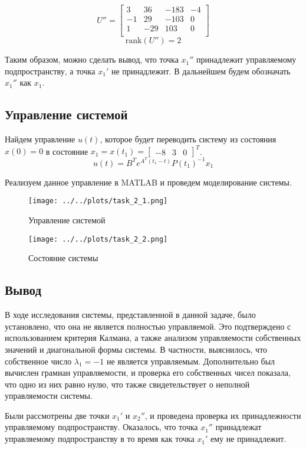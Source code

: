 \begin{equation}
   U'' = \begin{bmatrix}
        3 & 36 & -183 & -4 \\ 
        -1 & 29 & -103 & 0 \\ 
        1 & -29 & 103 & 0 \\
    \end{bmatrix}
\end{equation}
\begin{equation}
    \text{rank}(U'') = 2
\end{equation}

Таким образом, можно сделать вывод, что точка $x_1''$ принадлежит управляемому подпространству, а точка $x_1'$ не принадлежит. В дальнейшем будем обозначать $x_1''$ как $x_1$.

\subsection{Управление системой}
Найдем управление $u(t)$, которое будет переводить систему из состояния $x(0) = 0$ в состояние $x_1 = x(t_1) = \begin{bmatrix} -8 & 3 & 0 \end{bmatrix}^T$. 
\begin{equation}
    u(t) = B^Te^{A^T(t_1 - t)}P(t_1)^{-1}x_1
\end{equation}

Реализуем данное управление в MATLAB и проведем моделирование системы. 

\begin{figure}[H]
    \centering
    \texttt{[image: ../../plots/task\_2\_1.png]}
    \caption{Управление системой}
    \label{fig:task2_control_signal}
\end{figure}

\begin{figure}[H]
    \centering
    \texttt{[image: ../../plots/task\_2\_2.png]}
    \caption{Состояние системы}
    \label{fig:task2_state}
\end{figure}

\subsection{Вывод}
В ходе исследования системы, представленной в данной задаче, было установлено, 
что она не является полностью управляемой. 
Это подтверждено с использованием критерия Калмана, 
а также анализом управляемости собственных значений и диагональной формы системы. 
В частности, выяснилось, что собственное число $\lambda_1 = -1$ не является 
управляемым. Дополнительно был вычислен грамиан управляемости, 
и проверка его собственных чисел показала, что одно из них равно нулю, 
что также свидетельствует о неполной управляемости системы.

Были рассмотрены две точки $x_1'$ и $x_2''$, и проведена проверка их принадлежности 
управляемому подпространству. Оказалось, что точка $x_1''$ принадлежат управляемому подпространству
в то время как точка $x_1'$ ему не принадлежит. 
